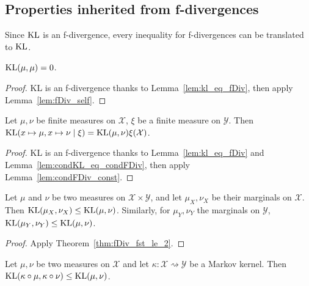 \subsection{Properties inherited from f-divergences}

Since $\operatorname{KL}$ is an f-divergence, every inequality for f-divergences can be translated to $\operatorname{KL}$.

\begin{lemma}
  \label{lem:kl_self}
  \mathlibok
  $\operatorname{KL}(\mu, \mu) = 0$.
\end{lemma}

\begin{proof}\mathlibok
  KL is an f-divergence thanks to Lemma~\ref{lem:kl_eq_fDiv}, then apply Lemma~\ref{lem:fDiv_self}.
\end{proof}

\begin{lemma}
  \label{lem:condKL_const}
  \leanok
  Let $\mu, \nu$ be finite measures on $\mathcal X$, $\xi$ be a finite measure on $\mathcal Y$. 
  Then $\operatorname{KL}(x \mapsto \mu, x \mapsto \nu \mid \xi) = \operatorname{KL}(\mu, \nu) \xi (\mathcal X)$.
\end{lemma}

\begin{proof} \leanok
  KL is an f-divergence thanks to Lemma~\ref{lem:kl_eq_fDiv} and Lemma~\ref{lem:condKL_eq_condFDiv}, then apply Lemma~\ref{lem:condFDiv_const}.
\end{proof}


\begin{theorem}[Marginals]
  \label{thm:kl_fst_le}
  \leanok
  Let $\mu$ and $\nu$ be two measures on $\mathcal X \times \mathcal Y$, and let $\mu_X, \nu_X$ be their marginals on $\mathcal X$.
  Then $\operatorname{KL}(\mu_X, \nu_X) \le \operatorname{KL}(\mu, \nu)$.
  Similarly, for $\mu_Y, \nu_Y$ the marginals on $\mathcal Y$, $\operatorname{KL}(\mu_Y, \nu_Y) \le \operatorname{KL}(\mu, \nu)$.
\end{theorem}

\begin{proof} \leanok
{}
Apply Theorem~\ref{thm:fDiv_fst_le_2}.
\end{proof}


\begin{theorem}
  \label{thm:kl_data_proc}
  \mathlibok
  Let $\mu, \nu$ be two measures on $\mathcal X$ and let $\kappa : \mathcal X \rightsquigarrow \mathcal Y$ be a Markov kernel.
  Then $\operatorname{KL}(\kappa \circ \mu, \kappa \circ \nu) \le \operatorname{KL}(\mu, \nu)$.
\end{theorem}


